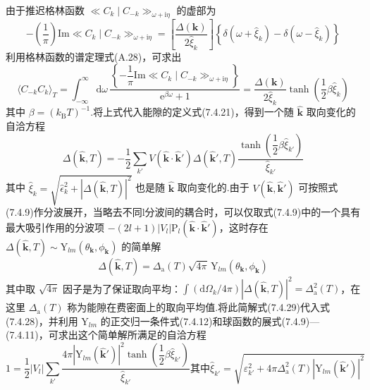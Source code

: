 由于推迟格林函数 $\ll C_{k}\mid C_{-k}\gg_{\omega+\mathrm{i}\eta}$ 的虚部为
\begin{equation}
  -\left(\frac{1}{\pi}\right)\mathrm{Im}\ll C_{k}\mid C_{-k}\gg_{\omega+\mathrm{i}\eta}
  =\left[\frac{\Delta(\boldsymbol{k})}{2\hat{\xi}_{k}}\right]
  \left\{\delta\left(\omega+\hat{\xi}_{k}\right)-\delta\left(\omega-\hat{\xi}_{k}\right)\right\}
\end{equation}
利用格林函数的谱定理式(A.28)，可求出
\begin{equation}
  \langle C_{-k}C_{k}\rangle_{T}
  =\int_{-\infty}^{\infty}\mathrm{d}\omega\,
  \frac{\left\{-\dfrac{1}{\pi}\mathrm{Im}\ll C_{k}\mid C_{-k}\gg_{\omega+\mathrm{i}\eta}\right\}}{\mathrm{e}^{\beta\omega}+1}
  =\frac{\Delta(\boldsymbol{k})}{2\hat{\xi}_{k}}\tanh\left(\frac{1}{2}\beta\hat{\xi}_{k}\right)
\end{equation}
其中 $\beta=\left(k_{\mathrm{B}}T\right)^{-1}$.将上式代入能隙的定义式(7.4.21)，得到一个随 $\hat{\boldsymbol{k}}$ 取向变化的自洽方程
\begin{equation}
  \Delta\left(\hat{\boldsymbol{k}},T\right)=-\frac{1}{2}\sum_{k'}V\left(\hat{\boldsymbol{k}}\cdot\hat{\boldsymbol{k}}'\right)
  \Delta\left(\hat{\boldsymbol{k}}',T\right)
  \frac{\tanh\left(\dfrac{1}{2}\beta\hat{\xi}_{k'}\right)}{\hat{\xi}_{k'}}
\end{equation}
其中 $\hat{\xi}_{k}=\sqrt{\hat{\epsilon}_{k}^{2}+\left|\Delta(\hat{\boldsymbol{k}},T)\right|^{2}}$ 也是随 $\hat{\boldsymbol{k}}$ 取向变化的.由于 $V\left(\hat{\boldsymbol{k}},\hat{\boldsymbol{k}}'\right)$ 可按照式(7.4.9)作分波展开，当略去不同l分波间的耦合时，可以仅取式(7.4.9)中的一个具有最大吸引作用的分波项 $-\left(2l+1\right)\allowbreak\left|V_{l}\right|\allowbreak\mathrm{P}_{l}\left(\hat{\boldsymbol{k}}\cdot\hat{\boldsymbol{k}}'\right)$，这时存在 $\Delta\left(\hat{\boldsymbol{k}},T\right)\sim\mathrm{Y}_{lm}\left(\theta_{\boldsymbol{k}},\phi_{\boldsymbol{k}}\right)$ 的简单解
\begin{equation}
  \Delta\left(\hat{\boldsymbol{k}},T\right)=\Delta_{\mathrm{a}}(T)\sqrt{4\pi}\,\mathrm{Y}_{lm}\left(\theta_{\boldsymbol{k}},\phi_{\boldsymbol{k}}\right)
\end{equation}
其中取 $\sqrt{4\pi}$ 因子是为了保证取向平均：$\int\left(\mathrm{d}\Omega_{k}/4\pi\right)\left|\Delta(\hat{\boldsymbol{k}},T)\right|^{2}=\Delta_{\mathrm{a}}^{2}(T)$，在这里 $\Delta_{\mathrm{a}}(T)$ 称为能隙在费密面上的取向平均值.将此简解式(7.4.29)代入式(7.4.28)，并利用 $\mathrm{Y}_{lm}$ 的正交归一条件式(7.4.12)和球函数的展式(7.4.9)—(7.4.11)，可求出这个简单解所满足的自洽方程
\begin{subequations}
\begin{equation}
  1=\frac{1}{2}\left|V_{l}\right|\sum_{k'}
  \frac{4\pi\left|\mathrm{Y}_{lm}(\hat{\boldsymbol{k}}')\right|^{2}\tanh\left(\dfrac{1}{2}\beta\hat{\xi}_{k'}\right)}{\hat{\xi}_{k'}}
\end{equation}
其中
\begin{equation}
  \hat{\xi}_{k'}=\sqrt{\varepsilon_{k'}^{2}+4\pi\Delta_{\mathrm{a}}^{2}(T)\left|\mathrm{Y}_{lm}(\hat{\boldsymbol{k}}')\right|^{2}}
\end{equation}
\end{subequations}
